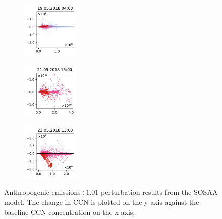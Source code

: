 \begin{figure}[H]
    \begin{subfigure}
        \centering
        \includegraphics[width=0.30\textwidth,valign=t]{evaluation/figures/perturbations/perturbation-19.05.2018:04.00-anthropogenic-div-1.01.pdf}
    \end{subfigure}
    \begin{subfigure}
        \centering
        \includegraphics[width=0.30\textwidth,valign=t]{evaluation/figures/perturbations/perturbation-21.05.2018:15.00-anthropogenic-div-1.01.pdf}
    \end{subfigure}
    \begin{subfigure}
        \centering
        \includegraphics[width=0.30\textwidth,valign=t]{evaluation/figures/perturbations/perturbation-23.05.2018:13.00-anthropogenic-div-1.01.pdf}
    \end{subfigure}

    \caption[Anthropogenic emissions$\div 1.01$ perturbation SOSAA results]{Anthropogenic emissions$\div 1.01$ perturbation results from the SOSAA model. The change in CCN is plotted on the y-axis against the baseline CCN concentration on the x-axis.}
    \label{fig:sosaa-perturbation-anthropogenic-div-1.01}
\end{figure}

